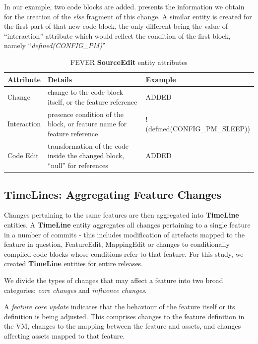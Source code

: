 In our example, two code blocks are added.  presents the information we obtain
for the creation of the \textit{else} fragment of this change.
A similar entity is created for the first part of that new code block, the only different being the value of 
``interaction'' attribute which would reflect the condition of the first block, namely ``\textit{defined(CONFIG\_PM)}''

\begin{table}[h]
\centering
\resizebox{\textwidth}{!}
{
\begin{tabular}{|l|l|l|}
\hline
Attribute & Details & Example\\
\hline
Change 			& change to the code block itself, or the feature reference &  ADDED \\
\hline
Interaction		& presence condition of the block, or feature name for feature reference & !(defined(CONFIG\_PM\_SLEEP)) \\
\hline
Code Edit		& transformation of the code inside the changed block, ``null'' for references  & ADDED \\
\hline
\end{tabular}
}
\caption{FEVER \textbf{SourceEdit} entity attributes }
\label{sourceedit_attrs}
\end{table}

\subsection{TimeLines: Aggregating Feature Changes}

Changes pertaining to the same features are then aggregated into \textbf{TimeLine} entities.
A \textbf{TimeLine} entity aggregates all changes pertaining to a single feature in a number of commits - this includes
modification of artefacts mapped to the feature in question, FeatureEdit, MappingEdit or changes to conditionally compiled code blocks whose conditions refer to that feature.
For this study, we created \textbf{TimeLine} entities for entire releases.

We divide the types of changes that may affect a feature into two broad categories: 
\emph{core changes} and \emph{influence changes}.

A \emph{feature core update} indicates that the behaviour of the feature itself or its definition is being adjusted.
This comprises changes to the feature definition in the VM, changes to the mapping between the feature and assets,
and changes affecting assets mapped to that feature. 

